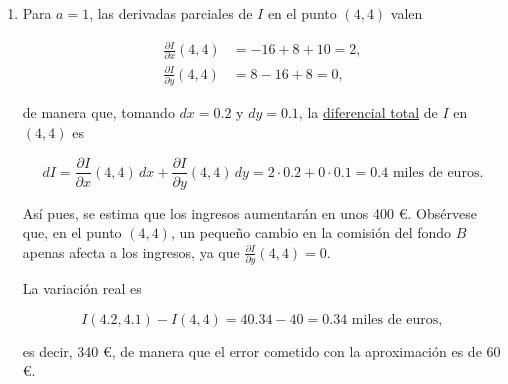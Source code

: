 \documentclass[
  spanish,
  a4paper,
]{scrreport}
\theoremstyle{definition}
\theoremstyle{remark}
\begin{document}
\begin{tcolorbox}
\begin{enumerate}
  \[
  I\left(\frac{14}{3}, \frac{13}{3}\right) = \frac{14}{3}\cdot 5 + \frac{13}{3}\cdot 4 = \frac{70 + 52}{3} = \frac{122}{3} \approx 40.67 \mbox{ miles de euros}.
  \]
\item
  Para \(a=1\), las derivadas parciales de \(I\) en el punto \((4,4)\)
  valen

  \begin{align*}
  \frac{\partial I}{\partial x}(4,4) &= -16 + 8 + 10 = 2, \\
  \frac{\partial I}{\partial y}(4,4) &= 8 - 16 + 8 = 0,
  \end{align*}

  de manera que, tomando \(dx = 0.2\) y \(dy = 0.1\), la
  \href{https://aprendeconalf.es/analisis-manual/13-derivadas-funciones-varias-variables.html\#def-diferencial-total}{diferencial
  total} de \(I\) en \((4,4)\) es

  \[
  dI = \frac{\partial I}{\partial x}(4,4)\,dx + \frac{\partial I}{\partial y}(4,4)\,dy = 2\cdot 0.2 + 0\cdot 0.1 = 0.4 \mbox{ miles de euros}.
  \]

  Así pues, se estima que los ingresos aumentarán en unos 400 €.
  Obsérvese que, en el punto \((4,4)\), un pequeño cambio en la comisión
  del fondo \(B\) apenas afecta a los ingresos, ya que
  \(\frac{\partial I}{\partial y}(4,4) = 0\).

  La variación real es

  \[
  I(4.2, 4.1) - I(4,4) = 40.34 - 40 = 0.34 \mbox{ miles de euros},
  \]

  es decir, 340 €, de manera que el error cometido con la aproximación
  es de 60 €.
\end{enumerate}

\end{tcolorbox}
\end{document}
